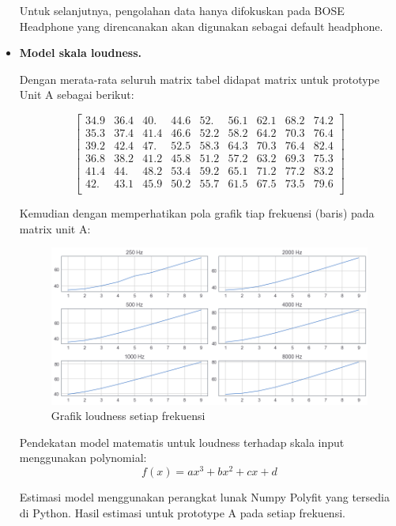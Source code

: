 \documentclass[12pt,]{article}
\begin{document}
\begin{itemize}
		Untuk selanjutnya, pengolahan data hanya difokuskan pada BOSE Headphone yang direncanakan akan
		digunakan sebagai default headphone.
		
		\item \textbf{Model skala loudness.}
		
		Dengan merata-rata seluruh matrix tabel didapat matrix untuk prototype Unit A sebagai berikut:
		
		\[\left[
		\begin{matrix}
			34.9 & 36.4 & 40. &  44.6 & 52. &  56.1 & 62.1 & 68.2 & 74.2\\
			35.3 & 37.4 & 41.4 & 46.6 & 52.2 & 58.2 & 64.2 & 70.3 & 76.4\\
			39.2 & 42.4 & 47. & 52.5 & 58.3 & 64.3 & 70.3 & 76.4 & 82.4\\
			36.8 & 38.2 & 41.2 & 45.8 & 51.2 & 57.2 & 63.2 & 69.3 & 75.3\\
			41.4 & 44. &  48.2 & 53.4 & 59.2 & 65.1 & 71.2 & 77.2 & 83.2\\
			42. &  43.1 & 45.9 & 50.2 & 55.7 & 61.5 & 67.5 & 73.5 & 79.6\\
		\end{matrix}
		\right]\]
	
		Kemudian dengan memperhatikan pola grafik tiap frekuensi (baris) pada matrix unit A:
		\begin{figure}[!ht]
			\centering
			\includegraphics[width=400pt]{images/graph/boseprotoA}
			\caption{Grafik loudness setiap frekuensi}
		\end{figure}
	
		Pendekatan model matematis untuk loudness terhadap skala input menggunakan polynomial:\\
		\[f(x) = ax^3 + bx^2 + cx + d\]
		
		Estimasi model menggunakan perangkat lunak Numpy Polyfit yang tersedia di Python.
		Hasil estimasi untuk prototype A pada setiap frekuensi.
		

\end{itemize}
\end{document}

